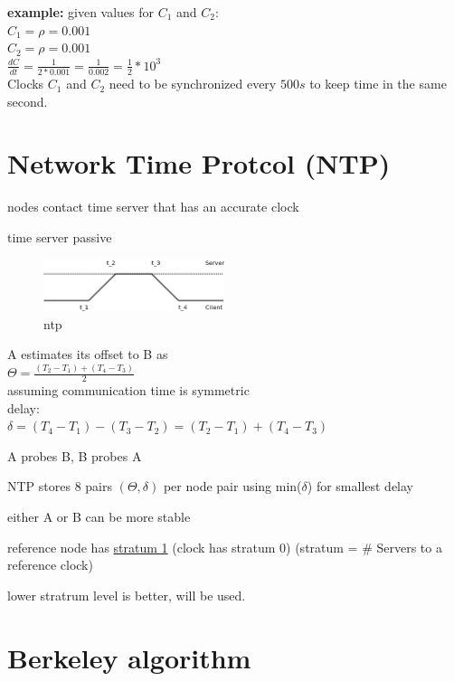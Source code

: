 \documentclass[ngerman,a4paper]{report}
\begin{document}
\textbf{example:} given values for $C_1$ and $C_2$:\\
$C_1 = \rho = 0.001$\\
$C_2 = \rho = 0.001$\\
$\frac{dC}{dt} = \frac {1}{2 * 0.001} = \frac{1}{0.002} = \frac{1}{2} * 10^{3}$\\
Clocks $C_1$ and $C_2$ need to be synchronized every $500s$ to keep time in the same second.\\

\section{Network Time Protcol (NTP)}
\begin{compactitem}
\item nodes contact time server that has an accurate clock
\item time server passive\\

\begin{figure}[h]
	\centering
	\includegraphics[width=200px]{gfx/ntp.png}
	\caption{ntp}
	\label{img:ntp}
\end{figure}

A estimates its offset to B as\\
$\Theta = \frac{(T_2 - T_1) + (T_4 - T_3)}{2}$\\
assuming communication time is symmetric\\
delay:\\
$\delta = (T_4 - T_1) - (T_3 - T_2) =  (T_2 - T_1) + (T_4 - T_3)$
\item A probes B, B probes A
\item NTP stores 8 pairs $(\Theta, \delta)$ per node pair using min($\delta$) for smallest delay
\item either A or B can be more stable
\item reference node has \underline{stratum  1} (clock has stratum 0) (stratum = \# Servers to a reference clock)
\item lower stratrum level is better, will be used.
\end{compactitem}

\section{Berkeley algorithm}
\end{document}
